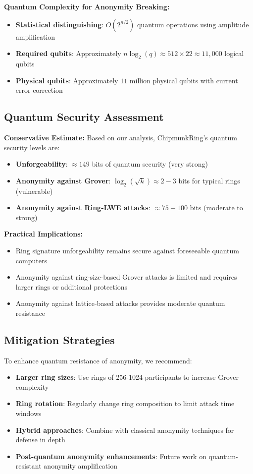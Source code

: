 \documentclass[11pt,a4paper]{article}
\begin{document}
\textbf{Quantum Complexity for Anonymity Breaking:}
\begin{itemize}
\item \textbf{Statistical distinguishing}: $O(2^{n/2})$ quantum operations using amplitude amplification
\item \textbf{Required qubits}: Approximately $n \log_2(q) \approx 512 \times 22 \approx 11,000$ logical qubits
\item \textbf{Physical qubits}: Approximately $11$ million physical qubits with current error correction
\end{itemize}

\subsection{Quantum Security Assessment}

\textbf{Conservative Estimate:} Based on our analysis, ChipmunkRing's quantum security levels are:

\begin{itemize}
\item \textbf{Unforgeability}: $\approx 149$ bits of quantum security (very strong)
\item \textbf{Anonymity against Grover}: $\log_2(\sqrt{k}) \approx 2-3$ bits for typical rings (vulnerable)
\item \textbf{Anonymity against Ring-LWE attacks}: $\approx 75-100$ bits (moderate to strong)
\end{itemize}

\textbf{Practical Implications:}
\begin{itemize}
\item Ring signature unforgeability remains secure against foreseeable quantum computers
\item Anonymity against ring-size-based Grover attacks is limited and requires larger rings or additional protections
\item Anonymity against lattice-based attacks provides moderate quantum resistance
\end{itemize}

\subsection{Mitigation Strategies}

To enhance quantum resistance of anonymity, we recommend:

\begin{itemize}
\item \textbf{Larger ring sizes}: Use rings of 256-1024 participants to increase Grover complexity
\item \textbf{Ring rotation}: Regularly change ring composition to limit attack time windows
\item \textbf{Hybrid approaches}: Combine with classical anonymity techniques for defense in depth
\item \textbf{Post-quantum anonymity enhancements}: Future work on quantum-resistant anonymity amplification
\end{itemize}
\end{document}
